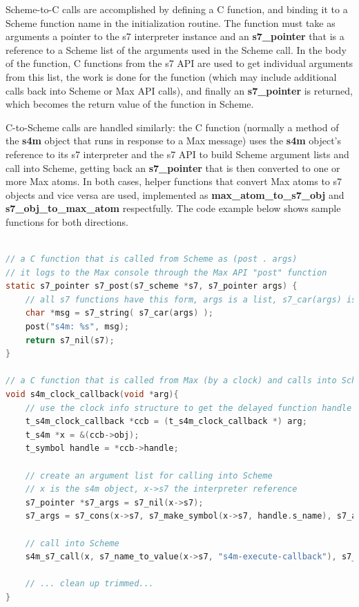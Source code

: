 \documentclass[acmsmall]{acmart}
\begin{document}
Scheme-to-C calls are accomplished by defining a C function, and binding
it to a Scheme function name in the initialization routine. 
The function must take as arguments a pointer to the s7 interpreter instance and an \textbf{s7\_pointer}
that is a reference to a Scheme list of the arguments used in the Scheme call.
In the body of the function, C functions from the s7 API are used to get 
individual arguments from this list, the work is done for the function 
(which may include additional calls back into Scheme or Max API calls),
and finally an \textbf{s7\_pointer} is returned, which becomes the return value of the 
function in Scheme.

C-to-Scheme calls are handled similarly: the C function (normally a method
of the \textbf{s4m} object that runs in response to a Max message) uses the
\textbf{s4m} object's reference to its s7 interpreter and the s7 API to build
Scheme argument lists and call into Scheme, getting back an \textbf{s7\_pointer} that
is then converted to one or more Max atoms. In both cases, helper
functions that convert Max atoms to s7 objects and vice versa are used, 
implemented as \textbf{max\_atom\_to\_s7\_obj} and \textbf{s7\_obj\_to\_max\_atom}
respectfully. The code example below shows sample functions for both directions.

\begin{lstlisting}[language=C]

// a C function that is called from Scheme as (post . args)
// it logs to the Max console through the Max API "post" function
static s7_pointer s7_post(s7_scheme *s7, s7_pointer args) {
    // all s7 functions have this form, args is a list, s7_car(args) is the first arg, etc 
    char *msg = s7_string( s7_car(args) );
    post("s4m: %s", msg);
    return s7_nil(s7);
}

// a C function that is called from Max (by a clock) and calls into Scheme
void s4m_clock_callback(void *arg){
    // use the clock info structure to get the delayed function handle
    t_s4m_clock_callback *ccb = (t_s4m_clock_callback *) arg;
    t_s4m *x = &(ccb->obj);
    t_symbol handle = *ccb->handle; 
    
    // create an argument list for calling into Scheme
    // x is the s4m object, x->s7 the interpreter reference
    s7_pointer *s7_args = s7_nil(x->s7);
    s7_args = s7_cons(x->s7, s7_make_symbol(x->s7, handle.s_name), s7_args);

    // call into Scheme 
    s4m_s7_call(x, s7_name_to_value(x->s7, "s4m-execute-callback"), s7_args);   
    
    // ... clean up trimmed... 
}

\end{lstlisting}
\end{document}
